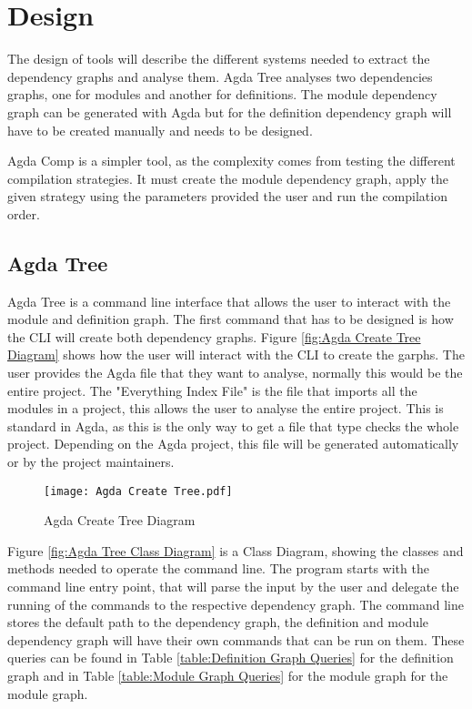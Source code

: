 
\chapter{Design}


The design of tools will describe the different systems needed to extract the
dependency graphs and analyse them. Agda Tree analyses two dependencies graphs,
one for modules and another for definitions. The module dependency graph can be
generated with Agda but for the definition dependency graph will have to be
created manually and needs to be designed.

Agda Comp is a simpler tool, as the complexity comes from testing the different
compilation strategies. It must create the module dependency graph, apply the
given strategy using the parameters provided the user and run the compilation
order. 


\pagebreak

\section{Agda Tree}

Agda Tree is a command line interface that allows the user to interact with the
module and definition graph. The first command that has to be designed is how
the CLI will create both dependency graphs. Figure \ref{fig:Agda Create Tree
Diagram} shows how the user will interact with the CLI to create the garphs.
The user provides the Agda file that they want to analyse, normally this would
be the entire project. The "Everything Index File" is the file that imports all
the modules in a project, this allows the user to analyse the entire project.
This is standard in Agda, as this is the only way to get a file that type
checks the whole project. Depending on the Agda project, this file will be
generated automatically or by the project maintainers.
\begin{figure}[H]
    \centering
    \texttt{[image: Agda Create Tree.pdf]}
    \caption{Agda Create Tree Diagram}
    \label{fig:Agda Create Tree Diagram}
\end{figure} 

\pagebreak

Figure \ref{fig:Agda Tree Class Diagram} is a Class Diagram, showing the
classes and methods needed to operate the command line. The program starts with
the command line entry point, that will parse the input by the user and
delegate the running of the commands to the respective dependency graph. The
command line stores the default path to the dependency graph, the definition
and module dependency graph will have their own commands that can be run on
them. These queries can be found in Table \ref{table:Definition Graph Queries}
for the definition graph and in Table \ref{table:Module Graph Queries} for the
module graph for the module graph.


